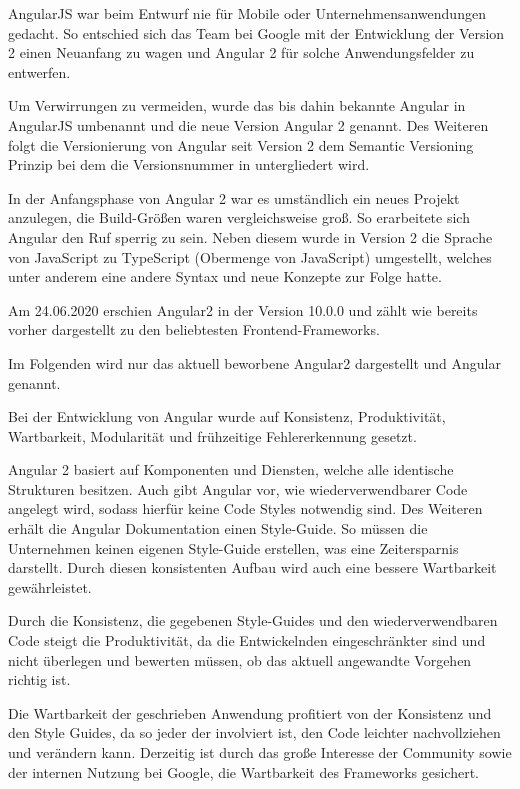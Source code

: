 AngularJS war beim Entwurf nie für Mobile oder Unternehmensanwendungen gedacht.
So entschied sich das Team bei Google mit der Entwicklung der Version 2 einen Neuanfang zu wagen und Angular 2 für solche Anwendungsfelder zu entwerfen.

Um Verwirrungen zu vermeiden, wurde das bis dahin bekannte Angular in AngularJS umbenannt und die neue Version Angular 2 genannt. Des Weiteren folgt die Versionierung von Angular seit Version 2 dem Semantic Versioning Prinzip bei dem die Versionsnummer in  untergliedert wird. 

In der Anfangsphase von Angular 2 war es umständlich ein neues Projekt anzulegen, die Build-Größen waren vergleichsweise groß. So erarbeitete sich Angular den Ruf sperrig zu sein.
Neben diesem wurde in Version 2 die Sprache von JavaScript zu TypeScript (Obermenge von JavaScript) umgestellt, welches unter anderem eine andere Syntax und neue Konzepte zur Folge hatte. \cite{gaviganHistoryAngular2018}

Am 24.06.2020 erschien Angular2 in der Version 10.0.0 \cite{googleAngularAngularVersioning2020} und zählt wie bereits vorher dargestellt zu den beliebtesten Frontend-Frameworks.

Im Folgenden wird nur das aktuell beworbene Angular2 dargestellt und Angular genannt.

Bei der Entwicklung von Angular wurde auf Konsistenz, Produktivität, Wartbarkeit, Modularität und frühzeitige Fehlererkennung gesetzt.

Angular 2 basiert auf Komponenten und Diensten, welche alle identische Strukturen besitzen. Auch gibt Angular vor, wie wiederverwendbarer Code angelegt wird, sodass hierfür keine Code Styles notwendig sind. Des Weiteren erhält die Angular Dokumentation einen Style-Guide. So müssen die Unternehmen keinen eigenen Style-Guide erstellen, was eine Zeitersparnis darstellt.
Durch diesen konsistenten Aufbau wird auch eine bessere Wartbarkeit gewährleistet.

Durch die Konsistenz, die gegebenen Style-Guides und den wiederverwendbaren Code steigt die Produktivität, da die Entwickelnden eingeschränkter sind und nicht überlegen und bewerten müssen, ob das aktuell angewandte Vorgehen richtig ist. 

Die Wartbarkeit der geschrieben Anwendung profitiert von der Konsistenz und den Style Guides, da so jeder der involviert ist, den Code leichter nachvollziehen und verändern kann. Derzeitig ist durch das große Interesse der Community sowie der internen Nutzung bei Google, die Wartbarkeit des Frameworks gesichert.

